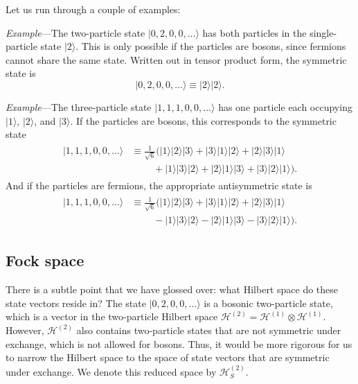 \documentclass[prx,12pt]{revtex4-2}
\begin{document}
Let us run through a couple of examples:

\begin{framed}
\noindent
\textit{Example}---The two-particle state $|0,2,0,0,\dots\rangle$ has
both particles in the single-particle state $|2\rangle$.  This is only
possible if the particles are bosons, since fermions cannot share the
same state.  Written out in tensor product form, the symmetric state
is
\begin{equation}
  |0,2,0,0,\dots\rangle \equiv |2\rangle|2\rangle.
\end{equation}
\end{framed}

\begin{framed}
\noindent
\textit{Example}---The three-particle state $|1,1,1,0,0,\dots\rangle$
has one particle each occupying $|1\rangle$, $|2\rangle$, and
$|3\rangle$.  If the particles are bosons, this corresponds to the
symmetric state
\begin{align}
  \begin{aligned}|1,1,1,0,0,\dots\rangle &\equiv \frac{1}{\sqrt{6}}\Big(|1\rangle|2\rangle|3\rangle + |3\rangle|1\rangle|2\rangle + |2\rangle|3\rangle|1\rangle \\&\;\qquad+ |1\rangle|3\rangle|2\rangle + |2\rangle|1\rangle|3\rangle + |3\rangle|2\rangle|1\rangle \Big).
  \end{aligned}
\end{align}
And if the particles are fermions, the appropriate antisymmetric state
is
\begin{align}
  \begin{aligned}|1,1,1,0,0,\dots\rangle &\equiv \frac{1}{\sqrt{6}} \Big(|1\rangle|2\rangle|3\rangle + |3\rangle|1\rangle|2\rangle + |2\rangle|3\rangle|1\rangle \\&\;\qquad - |1\rangle|3\rangle|2\rangle - |2\rangle|1\rangle|3\rangle - |3\rangle|2\rangle|1\rangle\Big).
  \end{aligned}
\end{align}
\end{framed}

\subsection{Fock space}

There is a subtle point that we have glossed over: what Hilbert space
do these state vectors reside in?  The state $|0,2,0,0,\dots\rangle$
is a bosonic two-particle state, which is a vector in the two-particle
Hilbert space $\mathscr{H}^{(2)} = \mathscr{H}^{(1)}\otimes
\mathscr{H}^{(1)}$.  However, $\mathscr{H}^{(2)}$ also contains
two-particle states that are not symmetric under exchange, which is
not allowed for bosons.  Thus, it would be more rigorous for us to
narrow the Hilbert space to the space of state vectors that are
symmetric under exchange.  We denote this reduced space by
$\mathscr{H}^{(2)}_S$.
\end{document}
